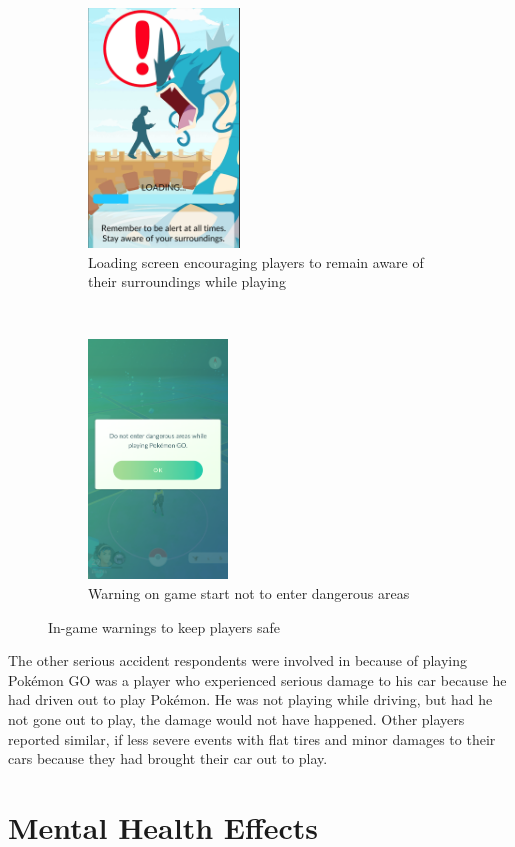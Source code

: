 \begin{figure}[h]
	\centering
	\begin{subfigure}[t]{0.4\textwidth}
		\centering
		\includegraphics[height=2.5in]{Figures/pogo-loading-screen}
		\caption{Loading screen encouraging players to remain aware of their surroundings while playing}
	\end{subfigure}
	~
	\begin{subfigure}[t]{0.4\textwidth}
		\centering
		\includegraphics[height=2.5in]{Figures/pogo-warning-dangerous-areas-lazy_panda42}
		\caption{Warning on game start not to enter dangerous areas}
	\end{subfigure}
	\caption{In-game warnings to keep players safe}
	\label{fig:game-warning-stay-safe}
\end{figure}

The other serious accident respondents were involved in because of playing Pokémon GO was a player who experienced serious damage to his car because he had driven out to play Pokémon. He was not playing while driving, but had he not gone out to play, the damage would not have happened. Other players reported similar, if less severe events with flat tires and minor damages to their cars because they had brought their car out to play.


\chapter{Mental Health Effects}
\label{chapter:player-study-mental}

